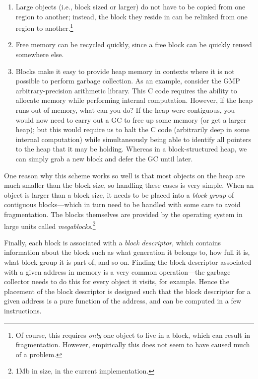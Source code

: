 \begin{enumerate}
    \item Large objects (i.e., block sized or larger) do not have to be copied from one region to
        another; instead, the block they reside in can be relinked from
        one region to another.\footnote{Of course, this requires \emph{only}
        one object to live in a block, which can result in fragmentation.
        However, empirically this does not seem to have caused much of a problem.}
    \item Free memory can be recycled quickly, since a free block can be quickly
        reused somewhere else.
    \item Blocks make it easy to provide heap memory in contexts where it is
        not possible to perform garbage collection.  As an example, consider
        the GMP arbitrary-precision arithmetic library.  This C code requires
        the ability to allocate memory while performing internal computation.
        However, if the heap runs out of memory, what can you do?  If the heap
        were contiguous, you would now need to carry out a GC to free up some memory
        (or get a larger heap); but this would require us to halt the C code
        (arbitrarily deep in some internal computation) while simultaneously being
        able to identify all pointers to the heap that it may be holding.  Whereas
        in a block-structured heap, we can simply grab a new block and defer the GC
        until later.
\end{enumerate}

One reason why this scheme works so well is that most objects on the
heap are much smaller than the block size, so handling these cases is very
simple.  When an object is larger than a block size, it needs to be
placed into a \emph{block group} of contiguous blocks---which in turn
need to be handled with some care to avoid fragmentation.  The blocks
themselves are provided by the operating system in large units called
\emph{megablocks}.\footnote{1Mb in size, in the current implementation.}

Finally, each block is associated with a \emph{block descriptor}, which
contains information about the block such as what generation it belongs to, how full it is, what block
group it is part of, and so on.  Finding the block descriptor
associated with a given address in memory is a very common
operation---the garbage collector needs to do this for every object it
visits, for example.  Hence the placement of the block descriptor is
designed such that the block descriptor for a given address is a pure function
of the address, and can be computed in a few instructions.

